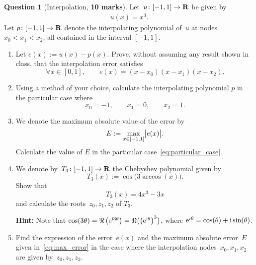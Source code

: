 \documentclass[11pt]{article}
\theoremstyle{definition}
\newtheorem{question}{Question}
\theoremstyle{remark}
\theoremstyle{plain}%
\begin{document}
\newpage
\begin{question}
    [Interpolation, \textbf{10 marks}]
    Let~$u\colon [-1, 1] \to \mathbf R$ be given by
    \begin{align*}
        u(x) = x^3.
    \end{align*}
    Let $p \colon [-1, 1] \to \mathbf R$ denote the interpolating polynomial of~$u$ at nodes $x_0 < x_1 < x_2$,
    all contained in the interval $[-1, 1]$.
    \begin{enumerate}
        \itemsep0pt
        \item
            Let $e(x) := u(x) - p(x)$.
            Prove, without assuming any result shown in class,
            that the interpolation error satisfies
            \[
                \forall x \in [0, 1], \qquad
                e(x) = (x-x_0) (x-x_1) (x-x_2).
            \]

        \item
            Using a method of your choice,
            calculate the interpolating polynomial $p$ in the particular case where
            \begin{equation}
                \label{eq:particular_case}
                x_0 = -1, \qquad x_1 = 0, \qquad x_2 = 1.
            \end{equation}

        \item {}
            We denote the maximum absolute value of the error by
            \begin{equation}
                \label{eq:max_error}
                E := \max_{x \in [-1, 1]} \abs[\big]{e(x)}.
            \end{equation}
            Calculate the value of $E$ in the particular case~\eqref{eq:particular_case}.

        \item
            We denote by~$T_3 \colon [-1, 1] \to \mathbf R$ the Chebyshev polynomial given by
            \[
                T_3(x) := \cos\bigl(3 \arccos(x)\bigr).
            \]
            Show that
            \[
                T_3(x) = 4x^3 - 3x
            \]
            and calculate the roots~$z_0, z_1, z_2$ of $T_3$.

            \textbf{Hint:} Note that $\cos (3 \theta) = \Re \left( \mathrm e^{\mathrm i 3\theta} \right) = \Re \bigl( \left(\mathrm e^{\mathrm i \theta} \right)^3 \bigr)$, where $\mathrm e^{i \theta} = \cos (\theta) + \mathrm i \sin (\theta)$.

        \item
            Find the expression of the error~$e(x)$ and the maximum absolute error~$E$ given in~\eqref{eq:max_error}
            in the case where the interpolation nodes~$x_0, x_1, x_2$ are given by~$z_0, z_1, z_2$.


\end{enumerate}
\end{question}
\end{document}
